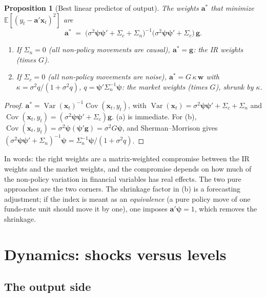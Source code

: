 \documentclass[11pt]{article}
\newtheorem{proposition}{Proposition}
\theoremstyle{definition}
\theoremstyle{remark}
\newcommand{\E}{\mathbb{E}}
\newcommand{\Var}{\operatorname{Var}}
\newcommand{\Cov}{\operatorname{Cov}}
\newcommand{\bpsi}{\boldsymbol{\psi}}
\newcommand{\bx}{\mathbf{x}}
\newcommand{\bg}{\mathbf{g}}
\newcommand{\bw}{\mathbf{w}}
\newcommand{\ba}{\mathbf{a}}
\begin{document}
\begin{proposition}[Best linear predictor of output]\label{prop:mixed}
The weights $\ba^*$ that minimize $\E[(y_t-\ba'\bx_t)^2]$ are
\begin{equation}\label{eq:mixed}
\ba^* \;=\; \bigl(\sigma^2\bpsi\bpsi'+\Sigma_c+\Sigma_n\bigr)^{-1}\bigl(\sigma^2\bpsi\bpsi'+\Sigma_c\bigr)\,\bg .
\end{equation}
\begin{enumerate}[label=(\alph*),leftmargin=2em]
\item If $\Sigma_n=0$ (all non-policy movements are causal), $\ba^*=\bg$: the IR weights (times $G$).
\item If $\Sigma_c=0$ (all non-policy movements are noise), $\ba^*=G\,\kappa\,\bw$ with $\kappa=\sigma^2q/(1+\sigma^2q)$, $q=\bpsi'\Sigma_n^{-1}\bpsi$: the market weights (times $G$), shrunk by $\kappa$.
\end{enumerate}
\end{proposition}

\begin{proof}
$\ba^*=\Var(\bx_t)^{-1}\Cov(\bx_t,y_t)$, with $\Var(\bx_t)=\sigma^2\bpsi\bpsi'+\Sigma_c+\Sigma_n$ and $\Cov(\bx_t,y_t)=(\sigma^2\bpsi\bpsi'+\Sigma_c)\bg$. (a) is immediate. For (b), $\Cov(\bx_t,y_t)=\sigma^2\bpsi(\bpsi'\bg)=\sigma^2G\bpsi$, and Sherman--Morrison gives $(\sigma^2\bpsi\bpsi'+\Sigma_n)^{-1}\bpsi=\Sigma_n^{-1}\bpsi/(1+\sigma^2q)$.
\end{proof}

\noindent In words: the right weights are a matrix-weighted compromise between the IR weights and the market weights, and the compromise depends on how much of the non-policy variation in financial variables has real effects. The two pure approaches are the two corners. The shrinkage factor in (b) is a forecasting adjustment; if the index is meant as an \emph{equivalence} (a pure policy move of one funds-rate unit should move it by one), one imposes $\ba'\bpsi=1$, which removes the shrinkage.

\section{Dynamics: shocks versus levels}\label{sec:dynamics}

\subsection{The output side}
\end{document}
